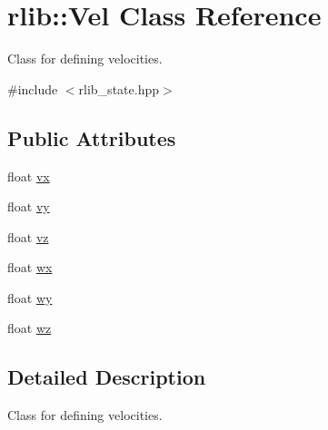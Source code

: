 \hypertarget{classrlib_1_1Vel}{\section{rlib\-:\-:Vel Class Reference}
\label{classrlib_1_1Vel}
}


Class for defining velocities.  




{\ttfamily \#include $<$rlib\-\_\-state.\-hpp$>$}

\subsection*{Public Attributes}
\begin{DoxyCompactItemize}
\item 
float \hyperlink{classrlib_1_1Vel_aba9035c6e774edd37f2421ec376bb8f3}{vx}
\item 
float \hyperlink{classrlib_1_1Vel_acb4d80d6a58e1813359f9931d2fc6c9e}{vy}
\item 
float \hyperlink{classrlib_1_1Vel_aab3819a2079bb4654939da51cf896af3}{vz}
\item 
float \hyperlink{classrlib_1_1Vel_adc2bc037dd0c69f0aaa972a41b8af55c}{wx}
\item 
float \hyperlink{classrlib_1_1Vel_a40c6bb36dcb99cd88214e92c8169e7b1}{wy}
\item 
float \hyperlink{classrlib_1_1Vel_a7f1cf4b7d0dba121ec54d0011eb1e4d5}{wz}
\end{DoxyCompactItemize}


\subsection{Detailed Description}
Class for defining velocities. 

